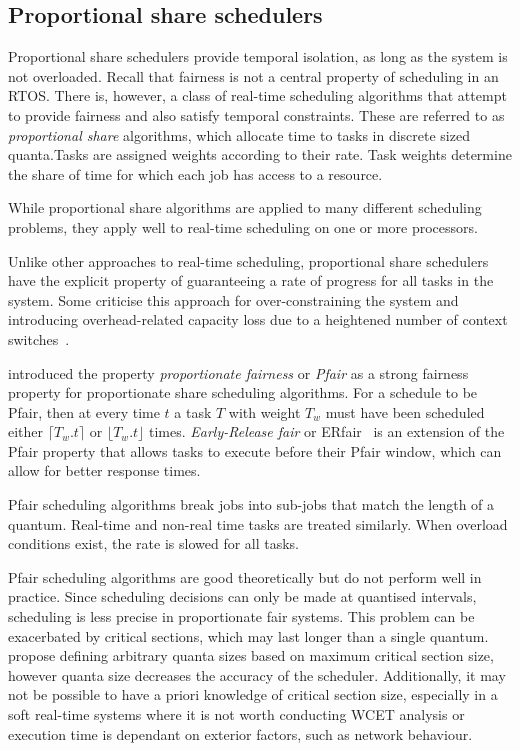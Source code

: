 \subsection{Proportional share schedulers}

Proportional share schedulers provide temporal isolation, as long as the system is not overloaded.
Recall that fairness is not a central property of scheduling in an \gls{RTOS}. There is, however, a class of real-time scheduling algorithms that attempt to provide fairness and also satisfy temporal constraints.
These are referred to as \emph{proportional share} algorithms, which allocate time to tasks in discrete sized quanta.Tasks are assigned weights according to their rate.
Task weights determine the share of time for which each job has access to a resource.

While proportional share algorithms are applied to many different scheduling problems, they apply well to real-time scheduling on one or more processors.

Unlike other approaches to real-time scheduling, proportional share schedulers have the explicit property of guaranteeing a rate of progress for all tasks in the system.
Some criticise this approach for over-constraining the system and introducing overhead-related capacity loss due to a heightened number of context switches~\citep{Abeni_Buttazzo_2004}.

\citet{Baruah_CPV_1996} introduced the property \emph{proportionate fairness} or \emph{Pfair} as a strong fairness property for proportionate share scheduling algorithms.
For a schedule to be Pfair, then at every time $t$ a task $T$ with weight $T_{w}$ must have been scheduled either $\lceil T_{w} . t \rceil$ or $\lfloor T_{w}.t \rfloor $ times.
\emph{Early-Release fair} or ERfair~\citep{Anderson_Srinivasan_2004} is an extension of the Pfair property that allows tasks to execute before their Pfair window, which can allow for better response times.

Pfair scheduling algorithms break jobs into sub-jobs that match the length of a quantum.
Real-time and non-real time tasks are treated similarly.
When overload conditions exist, the rate is slowed for all tasks.

Pfair scheduling algorithms are good theoretically but do not perform well in practice.
Since scheduling decisions can only be made at quantised intervals, scheduling is less precise in proportionate fair systems.
This problem can be exacerbated by critical sections, which may last longer than a single quantum.
\citet{Stoica_AKBGP_96} propose defining arbitrary quanta sizes based on maximum critical section size, however quanta size decreases the accuracy of the scheduler.
Additionally, it may not be possible to have a priori knowledge of critical section size, especially in a soft real-time systems where it is not worth conducting \gls{WCET} analysis or execution time is dependant on exterior factors, such as network behaviour.

